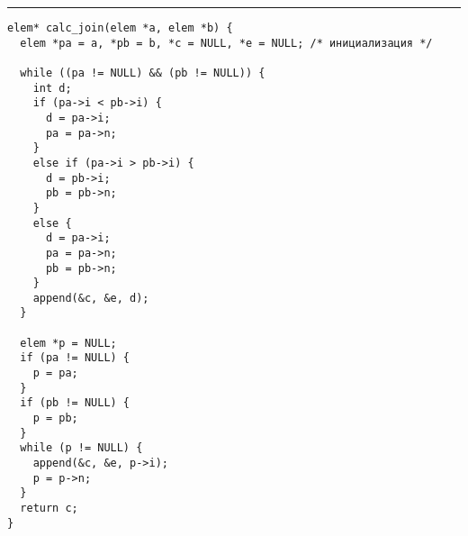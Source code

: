 \documentclass{article}
\begin{document}
\lstset{language = C,
    extendedchars = \true,
    keepspaces = true,
    breaklines=true,
    frame=lines}
\hrule
\begin{lstlisting}[title=\textbf {Алгоритм 1.2} Построение бинарного кода Грея]
elem* calc_join(elem *a, elem *b) {
  elem *pa = a, *pb = b, *c = NULL, *e = NULL; /* инициализация */

  while ((pa != NULL) && (pb != NULL)) {
    int d;
    if (pa->i < pb->i) {
      d = pa->i;
      pa = pa->n;
    }
    else if (pa->i > pb->i) {
      d = pb->i;
      pb = pb->n;
    }
    else {
      d = pa->i;
      pa = pa->n;
      pb = pb->n;
    }
    append(&c, &e, d);
  }

  elem *p = NULL;
  if (pa != NULL) {
    p = pa;
  }
  if (pb != NULL) {
    p = pb;
  }
  while (p != NULL) {
    append(&c, &e, p->i);
    p = p->n;
  }
  return c;
}
\end{lstlisting}
\end{document}
